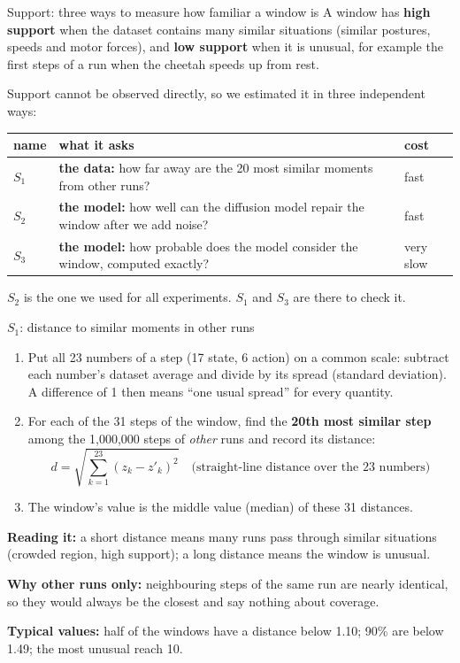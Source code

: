 \documentclass[aspectratio=169,10pt]{beamer}
\begin{document}
\begin{frame}{Support: three ways to measure how familiar a window is}
A window has \textbf{high support} when the dataset contains many similar situations (similar postures, speeds and motor forces), and \textbf{low support} when it is unusual, for example the first steps of a run when the cheetah speeds up from rest.
\vspace{0.6em}

Support cannot be observed directly, so we estimated it in three independent ways:
\vspace{0.4em}

\renewcommand{\arraystretch}{1.25}
\begin{tabularx}{\linewidth}{@{}lYl@{}}
\toprule
name & what it asks & cost\\
\midrule
$S_1$ & \textbf{the data:} how far away are the 20 most similar moments from other runs? & fast\\
$S_2$ & \textbf{the model:} how well can the diffusion model repair the window after we add noise? & fast\\
$S_3$ & \textbf{the model:} how probable does the model consider the window, computed exactly? & very slow\\
\bottomrule
\end{tabularx}
\vspace{0.6em}

$S_2$ is the one we used for all experiments. $S_1$ and $S_3$ are there to check it.
\end{frame}

\begin{frame}{$S_1$: distance to similar moments in other runs}
\begin{enumerate}
\item Put all 23 numbers of a step (17 state, 6 action) on a common scale: subtract each number's dataset average and divide by its spread (standard deviation). A difference of 1 then means ``one usual spread'' for every quantity.
\item For each of the 31 steps of the window, find the \textbf{20th most similar step} among the 1{,}000{,}000 steps of \emph{other} runs and record its distance:
\[
d = \sqrt{\textstyle\sum_{k=1}^{23} (z_k - z'_k)^2}\quad\text{(straight-line distance over the 23 numbers)}
\]
\item The window's value is the middle value (median) of these 31 distances.
\end{enumerate}
\vspace{0.3em}
\textbf{Reading it:} a short distance means many runs pass through similar situations (crowded region, high support); a long distance means the window is unusual.
\vspace{0.3em}

\textbf{Why other runs only:} neighbouring steps of the same run are nearly identical, so they would always be the closest and say nothing about coverage.
\vspace{0.3em}

\textbf{Typical values:} half of the windows have a distance below 1.10; 90\% are below 1.49; the most unusual reach 10.
\end{frame}
\end{document}
